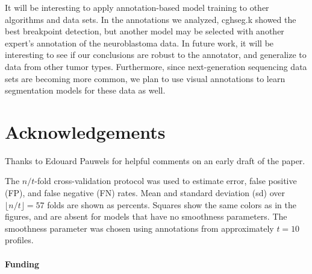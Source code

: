 \documentclass{bioinfo}
\newcommand{\model}[1]{#1}
\begin{document}
It will be interesting to apply annotation-based model training to
other algorithms and data sets.  In the annotations we analyzed,
\model{cghseg.k} showed the best breakpoint detection, but another
model may be selected with another expert's annotation of the neuroblastoma
data. In future work, it will be interesting to see if our conclusions
are robust to the annotator, and generalize to data from other tumor
types. Furthermore, since next-generation sequencing data sets are
becoming more common, we plan to use visual annotations to learn
segmentation models for these data as well.


\section*{Acknowledgements}
Thanks to Edouard Pauwels for helpful comments on an early draft of
the paper.
 



\begin{table}[b]
\begin{center}

\end{center}
\caption{\label{table-error-on-unseen-profiles}
  The $n/t$-fold cross-validation protocol was used to estimate
  error, false positive (FP), and false negative (FN) rates.
  Mean and standard deviation (sd) over
  $\lfloor n/t\rfloor =57$ folds are shown as percents.
  Squares show the same colors as in the figures, 
  and are absent for models that have no smoothness parameters.
  The smoothness parameter was
  chosen using annotations from approximately $t=10$ profiles. 
}
\end{table}




\paragraph{Funding\textcolon}
\end{document}
